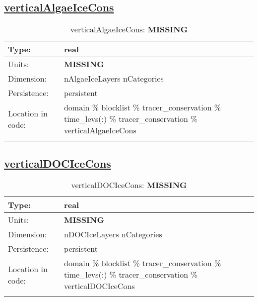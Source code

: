 \subsection[verticalAlgaeIceCons]{\hyperref[sec:var_tab_tracer_conservation]{verticalAlgaeIceCons}}
\label{subsec:var_sec_tracer_conservation_verticalAlgaeIceCons}
\begin{center}
\begin{longtable}{| p{2.0in} | p{4.0in} |}
        \hline 
        Type: & real \\
        \hline 
        Units: & {\bf \color{red} MISSING} \\
        \hline 
        Dimension: & nAlgaeIceLayers nCategories \\
        \hline 
        Persistence: & persistent \\
        \hline 
         Location in code: & domain \% blocklist \% tracer\_conservation \% time\_levs(:) \% tracer\_conservation \% verticalAlgaeIceCons \\
         \hline 
    \caption{verticalAlgaeIceCons: {\bf \color{red} MISSING}}
\end{longtable}
\end{center}
\subsection[verticalDOCIceCons]{\hyperref[sec:var_tab_tracer_conservation]{verticalDOCIceCons}}
\label{subsec:var_sec_tracer_conservation_verticalDOCIceCons}
\begin{center}
\begin{longtable}{| p{2.0in} | p{4.0in} |}
        \hline 
        Type: & real \\
        \hline 
        Units: & {\bf \color{red} MISSING} \\
        \hline 
        Dimension: & nDOCIceLayers nCategories \\
        \hline 
        Persistence: & persistent \\
        \hline 
         Location in code: & domain \% blocklist \% tracer\_conservation \% time\_levs(:) \% tracer\_conservation \% verticalDOCIceCons \\
         \hline 
    \caption{verticalDOCIceCons: {\bf \color{red} MISSING}}
\end{longtable}
\end{center}
